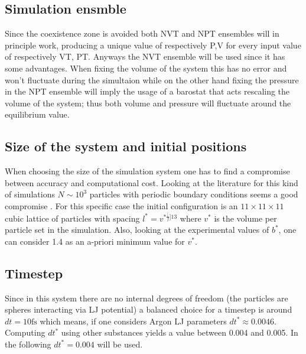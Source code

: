 \documentclass[a4paper, 11pt]{article}
\begin{document}
  \subsection{Simulation ensmble}
    Since the coexistence zone is avoided both NVT and NPT ensembles will in principle work, producing a unique value of respectively P,V for every input value of respectively VT, PT. Anyways the NVT ensemble will be used since it has some advantages.
    When fixing the volume of the system this has no error and won't fluctuate during the simultaion while on the other hand fixing the pressure in the NPT ensemble will imply the usage of a barostat that acts rescaling the volume of the system; thus both volume and pressure will fluctuate around the equilibrium value.%

  \subsection{Size of the system and initial positions}
    When choosing the size of the simulation system one has to find a compromise between accuracy and computational cost. Looking at the literature for this kind of simulations $N \sim 10^3$ particles with periodic boundary conditions seems a good compromise \cite{rif:article1}. For this specific case the initial configuration is an $11 \times 11 \times 11$ cubic lattice of particles with spacing $l^* = v^{*\frac[f]{1}{3}}$ where $v^*$ is the volume per particle set in the simulation. Also, looking at the experimental values of $b^*$, one can consider 1.4 as an a-priori minimum value for $v^*$.

  \subsection{Timestep}
    Since in this system there are no internal degrees of freedom (the particles are spheres interacting via LJ potential) a balanced choice for a timestep is around $dt = 10 \si{\femto\second}$ which means, if one considers Argon LJ parameters $dt^* \approx 0.0046$. Computing $dt^*$ using other substances yields a value between 0.004 and 0.005. In the following $dt^* = 0.004$ will be used.
\end{document}
